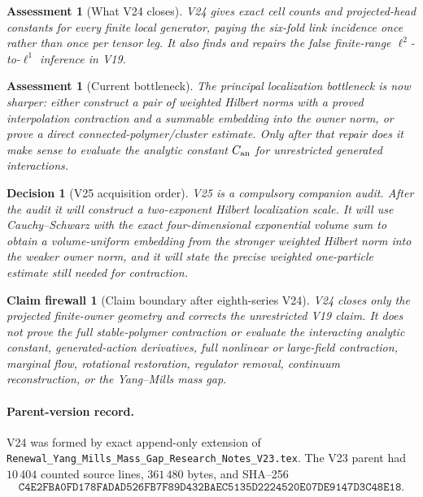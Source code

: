 \documentclass[11pt,oneside]{book}
\newtheorem{assessment}[theorem]{Assessment}
\newtheorem{firewall}[theorem]{Claim firewall}
\newtheorem{decision}[theorem]{Decision}
\theoremstyle{definition}
\theoremstyle{remark}
\begin{document}
\begin{assessment}[What V24 closes]
\label{ass:e8v24-closes}
V24 gives exact cell counts and projected-head constants for every
finite local generator, paying the six-fold link incidence once rather
than once per tensor leg.  It also finds and repairs the false
finite-range \(\ell^2\)-to-\(\ell^1\) inference in V19.
\end{assessment}

\begin{assessment}[Current bottleneck]
\label{ass:e8v24-remains}
The principal localization bottleneck is now sharper: either construct
a pair of weighted Hilbert norms with a proved interpolation
contraction and a summable embedding into the owner norm, or prove a
direct connected-polymer/cluster estimate.  Only after that repair
does it make sense to evaluate the analytic constant \(C_{\rm an}\)
for unrestricted generated interactions.
\end{assessment}

\begin{decision}[V25 acquisition order]
\label{dec:e8v24-v25}
V25 is a compulsory companion audit.  After the audit it will construct
a two-exponent Hilbert localization scale.  It will use
Cauchy--Schwarz with the exact four-dimensional exponential volume
sum to obtain a volume-uniform embedding from the stronger weighted
Hilbert norm into the weaker owner norm, and it will state the precise
weighted one-particle estimate still needed for contraction.
\end{decision}

\begin{firewall}[Claim boundary after eighth-series V24]
\label{fire:e8v24-claim}
V24 closes only the projected finite-owner geometry and corrects the
unrestricted V19 claim.  It does not prove the full stable-polymer
contraction or evaluate the interacting analytic constant,
generated-action derivatives, full nonlinear or large-field
contraction, marginal flow, rotational restoration, regulator
removal, continuum reconstruction, or the Yang--Mills mass gap.
\end{firewall}

\paragraph{Parent-version record.}
V24 was formed by exact append-only extension of
\texttt{Renewal\_Yang\_Mills\_Mass\_Gap\_Research\_Notes\_V23.tex}.
The V23 parent had \(10\,404\) counted source lines,
\(361\,480\) bytes, and SHA--256
\[
\texttt{C4E2FBA0FD178FADAD526FB7F89D432BAEC5135D2224520E07DE9147D3C48E18}.
\]
\end{document}
